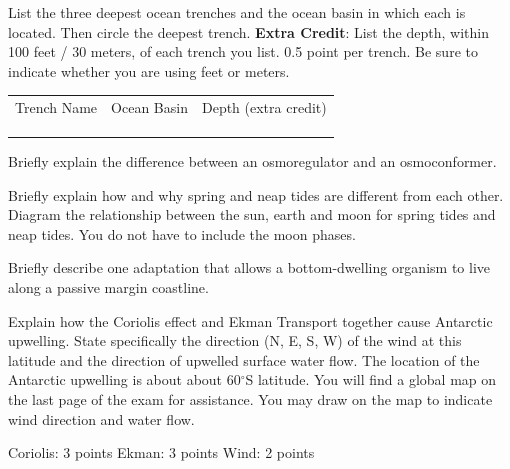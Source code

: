 \documentclass[11pt]{exam}
\begin{document}
\begin{questions}
\question[5]
List the three deepest ocean trenches and the ocean basin in which each is located.  Then circle the deepest trench. \textbf{Extra Credit}:  List the depth, within 100 feet / 30 meters, of each trench you list. 0.5 point per trench. Be sure to indicate whether you are using feet or meters.

\vspace{\baselineskip}

	\begin{tabular}{ccc}
		\large Trench Name		&	\large Ocean Basin	&	\large Depth \small(extra credit) \\[5ex]
		\makebox[5cm]{\hrulefill} & \makebox[5cm]{\hrulefill} & \makebox[4cm]{\hrulefill} \\[5ex]
		\makebox[5cm]{\hrulefill} & \makebox[5cm]{\hrulefill} & \makebox[4cm]{\hrulefill}\\[5ex]
		\makebox[5cm]{\hrulefill} & \makebox[5cm]{\hrulefill} & \makebox[4cm]{\hrulefill} \\
	\end{tabular}

\question[5]
Briefly explain the difference between an osmoregulator and an osmoconformer.

\question[10]
Briefly explain how and why spring and neap tides are different from each other. Diagram the relationship between the sun, earth and moon for spring tides and neap tides. You do not have to include the moon phases.

\newpage

\question[5]
Briefly describe one adaptation that allows a bottom-dwelling organism to live along a passive margin coastline.


\question[10]
Explain how the Coriolis effect and Ekman Transport together cause Antarctic upwelling. State specifically the direction (N, E, S, W) of the wind at this latitude and the direction of upwelled surface water flow.  The location of the Antarctic upwelling is about about 60$^\circ$S latitude.  You will find a global map on the last page of the exam for assistance.  You may draw on the map to indicate wind direction and water flow.


\begin{solution}
Coriolis: 3 points
Ekman: 3 points
Wind: 2 points
\end{solution}


\end{questions}
\end{document}
